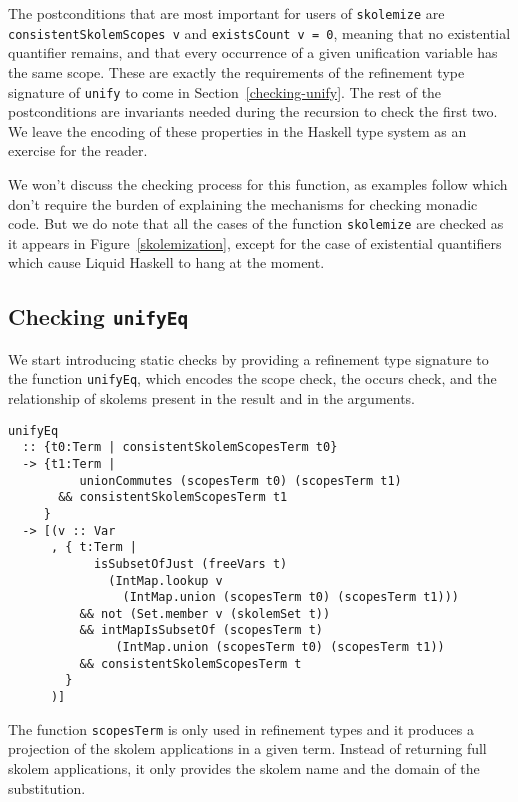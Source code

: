 \documentclass[sigconf, anonymous, review]{acmart}
\newcommand{\tc}[1]{{\small\texttt{#1}}}
\begin{document}
The postconditions that are most important for users of \tc{skolemize} are
\tc{consistentSkolemScopes v} and \tc{existsCount v = 0}, meaning that no
existential quantifier remains, and that every occurrence of a given
unification variable has the same scope. These are exactly the requirements
of the refinement type signature of \tc{unify} to come in Section~\ref{checking-unify}.
The rest of the postconditions are invariants needed during the recursion
to check the first two.
We leave the encoding of these properties in the Haskell type system as an
exercise for the reader.

We won't discuss the checking process for this function, as examples follow
which  don't require the burden of explaining the mechanisms for
checking monadic code. But we do note that all the cases of the function
\tc{skolemize} are checked as it appears in Figure~\ref{skolemization},
except for the case of existential quantifiers which cause Liquid Haskell
to hang at the moment.


\subsection{Checking \tc{unifyEq}}

We start introducing static checks by providing a refinement type signature to
the function \tc{unifyEq}, which encodes the scope check, the occurs check,
and the relationship of skolems present in the result and in the arguments.

\begin{verbatim}
unifyEq
  :: {t0:Term | consistentSkolemScopesTerm t0}
  -> {t1:Term |
          unionCommutes (scopesTerm t0) (scopesTerm t1)
       && consistentSkolemScopesTerm t1
     }
  -> [(v :: Var
      , { t:Term |
            isSubsetOfJust (freeVars t)
              (IntMap.lookup v
                (IntMap.union (scopesTerm t0) (scopesTerm t1)))
          && not (Set.member v (skolemSet t))
          && intMapIsSubsetOf (scopesTerm t)
               (IntMap.union (scopesTerm t0) (scopesTerm t1))
          && consistentSkolemScopesTerm t
        }
      )]
\end{verbatim}

The function \tc{scopesTerm} is only used in refinement types and it produces
a projection of the skolem applications in a given term. Instead of returning
full skolem applications, it only provides the skolem name and the domain of
the substitution.
\end{document}
